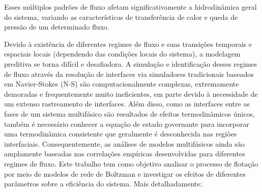 \documentclass[12pt]{article}
\begin{document}
Esses múltiplos padrões de fluxo afetam significativamente a hidrodinâmica geral do sistema, variando as características de transferência de calor e queda de pressão de um determinado fluxo.\newline

Devido à existência de diferentes regimes de fluxo e suas transições temporais e espaciais locais (dependendo das condições locais do sistema), a modelagem preditiva se torna difícil e desafiadora. A simulação e identificação desses regimes de fluxo através da resolução de interfaces via simuladores tradicionais baseados em Navier-Stokes (N-S) são computacionalmente complexas, extremamente demoradas e frequentemente muito ineficientes, em parte devido à necessidade de um extenso rastreamento de interfaces. \newline
Além disso, como as interfaces entre as fases de um sistema multifásico são resultados de efeitos termodinâmicos únicos, também é necessário conhecer a equação de estado governante para incorporar uma termodinâmica consistente que geralmente é desconhecida nas regiões interfaciais. Consequentemente, as análises de modelos multifásicos ainda são amplamente baseadas nas correlações empíricas desenvolvidas para diferentes regimes de fluxo.\newline
Este trabalho tem como objetivo analisar o processo de flotação por meio de modelos de rede de Boltzman e investigar os efeitos de diferentes parâmetros sobre a eficiência do sistema. Mais detalhadamente:
\end{document}
